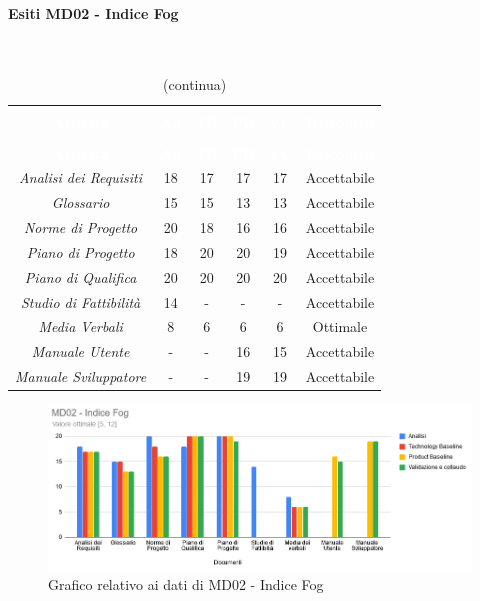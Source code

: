 \paragraph{Esiti MD02 - Indice Fog} \mbox{} \\
\begin{longtable}{c c c c c c}
\rowcolor{white}\caption{Esiti MD02 - Indice Fog} \\
		\rowcolor{redafk}
\textcolor{white}{\textbf{Attività}} &
\textcolor{white}{\textbf{An}} &
\textcolor{white}{\textbf{TB}} &
\textcolor{white}{\textbf{PB}} &
\textcolor{white}{\textbf{VC}} &
\textcolor{white}{\textbf{Riscontro}}  \\
		\endfirsthead
		\rowcolor{white}\caption[]{(continua)} \\
		\rowcolor{redafk}
\textcolor{white}{\textbf{Attività}} &
\textcolor{white}{\textbf{An}} &
\textcolor{white}{\textbf{TB}} &
\textcolor{white}{\textbf{PB}} &
\textcolor{white}{\textbf{VC}} &
\textcolor{white}{\textbf{Riscontro}}  \\
		\endhead
\textit{Analisi dei Requisiti} & 18 & 17 & 17 & 17 & Accettabile\\
\textit{Glossario} & 15 & 15 & 13 & 13 & Accettabile \\
\textit{Norme di Progetto} & 20 & 18 & 16 & 16 & Accettabile\\
\textit{Piano di Progetto} & 18 & 20 & 20 & 19 & Accettabile\\
\textit{Piano di Qualifica} & 20 & 20 & 20 & 20 & Accettabile\\
\textit{Studio di Fattibilità} & 14 & - & - & - & Accettabile\\
\textit{Media Verbali} & 8 & 6 & 6 & 6 & Ottimale\\
\textit{Manuale Utente} & - & - & 16 & 15 & Accettabile \\
\textit{Manuale Sviluppatore} & - & - & 19 & 19 & Accettabile\\
\end{longtable}

\begin{figure}[H]
\centering
\includegraphics[scale=0.7]{./img/MD02_fog.png}
\caption{Grafico relativo ai dati di MD02 - Indice Fog}
\end{figure}

